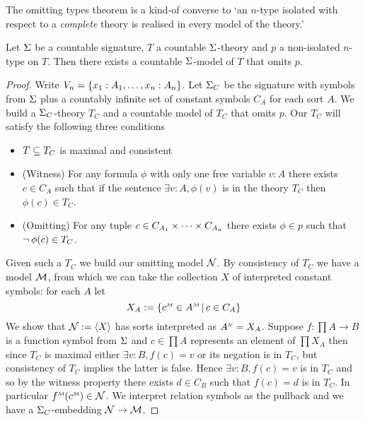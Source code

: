 The omitting types theorem is a kind-of converse to 
`an $n$-type isolated with respect to a \textit{complete} 
theory is realised in every model of the theory.'

\begin{prop}\cite{henson}
    Let $\Sigma$ be a countable signature, $T$ a countable $\Sigma$-theory 
    and $p$ a non-isolated $n$-type on $T$.
    Then there exists a countable $\Sigma$-model of $T$ that omits $p$.
\end{prop}
\begin{proof}
    Write $V_n = \left\{x_1 : A_1, \dots, x_n : A_n\right\}$.
    Let $\Sigma_C$ be the signature with symbols from $\Sigma$ 
    plus a countably infinite set of constant symbols $C_A$ 
    for each sort $A$.
    We build a $\Sigma_C$-theory $T_C$ and a 
    countable model of $T_C$ that omits $p$. 
    Our $T_C$ will satisfy the following three conditions
    \begin{itemize}
        \item $T \subseteq T_C$ is maximal and consistent
        \item (Witness) For any formula $\phi$ with only one free variable 
        $v : A$ there exists $c \in C_A$ such that if the sentence 
        $\exists v : A,\phi(v)$ is in the theory $T_C$ then $\phi(c) \in T_C$.
        \item (Omitting) For any tuple $c \in C_{A_1} \times \dots \times C_{A_n}$ there exists 
        $\phi \in p$ such that $\neg\, \phi(c) \in T_C$.
    \end{itemize}
    Given such a $T_C$ we build our omitting model $\mathcal{N}$.
    By consistency of $T_C$ we have a model $\mathcal{M}$, 
    from which we can take the collection $X$ of interpreted constant symbols:
    for each $A$ let 
    \[
        X_A := \set{\mmintp{c} \in \mmintp{A} \st c \in C_A}
    \]
    We show that $\mathcal{N} := \langle X\rangle$
    has sorts interpreted as $\nnintp{A} = X_A$.
    Suppose $f : \prod A \to B$ is a function symbol from $\Sigma$ and 
    $c \in \prod A$ represents an element of $\prod X_A$
    then since $T_C$ is maximal either $\exists v : B, f(c) = v$ 
    or its negation is in $T_C$, 
    but consistency of $T_C$ implies the latter is false.
    Hence $\exists v : B, f(c) = v$ is in $T_C$ and so by the witness property 
    there exists $d \in C_B$ such that $f(c) = d$ is in $T_C$.
    In particular $\mmintp{f}(\mmintp{c}) \in \NN$.
    We interpret relation symbols as the pullback and we have a 
    $\Sigma_C$-embedding $\mathcal{N} \to \mathcal{M}$.


\end{proof}
